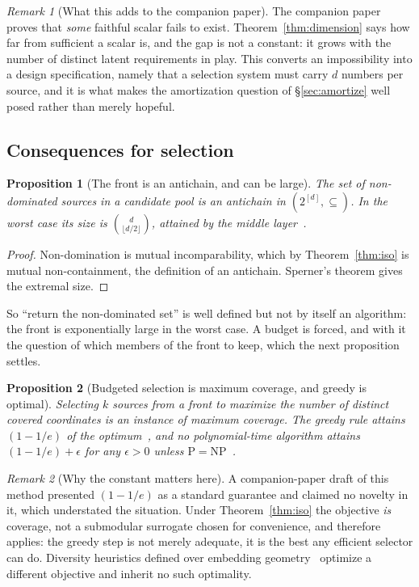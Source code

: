 \documentclass[11pt]{article}
\theoremstyle{plain}
\newtheorem{proposition}{Proposition}
\theoremstyle{definition}
\theoremstyle{remark}
\newtheorem{remark}{Remark}
\begin{document}
\begin{remark}[What this adds to the companion paper]
The companion paper proves that \emph{some} faithful scalar fails to exist. Theorem~\ref{thm:dimension}
says how far from sufficient a scalar is, and the gap is not a constant: it grows with the number
of distinct latent requirements in play. This converts an impossibility into a design specification,
namely that a selection system must carry $d$ numbers per source, and it is what makes the
amortization question of \S\ref{sec:amortize} well posed rather than merely hopeful.
\end{remark}

\subsection{Consequences for selection}
\label{sec:structure}

\begin{proposition}[The front is an antichain, and can be large]\label{prop:antichain}
The set of non-dominated sources in a candidate pool is an antichain in $(2^{[d]},\subseteq)$. In
the worst case its size is $\binom{d}{\lfloor d/2 \rfloor}$, attained by the middle
layer~\citep{sperner1928}.
\end{proposition}

\begin{proof}
Non-domination is mutual incomparability, which by Theorem~\ref{thm:iso} is mutual non-containment,
the definition of an antichain. Sperner's theorem gives the extremal size.
\end{proof}

So ``return the non-dominated set'' is well defined but not by itself an algorithm: the front is
exponentially large in the worst case. A budget is forced, and with it the question of which
members of the front to keep, which the next proposition settles.

\begin{proposition}[Budgeted selection is maximum coverage, and greedy is optimal]\label{prop:maxcover}
Selecting $k$ sources from a front to maximize the number of distinct covered coordinates is an
instance of maximum coverage. The greedy rule attains $(1-1/e)$ of the
optimum~\citep{nemhauser1978}, and no polynomial-time algorithm attains $(1-1/e)+\epsilon$ for any
$\epsilon>0$ unless $\mathrm{P} = \mathrm{NP}$~\citep{feige1998}.
\end{proposition}

\begin{remark}[Why the constant matters here]
A companion-paper draft of this method presented $(1-1/e)$ as a standard guarantee and claimed no
novelty in it, which understated the situation. Under Theorem~\ref{thm:iso} the objective
\emph{is} coverage, not a submodular surrogate chosen for convenience, and therefore
\citet{feige1998} applies: the greedy step is not merely adequate, it is the best any efficient
selector can do. Diversity heuristics defined over embedding
geometry~\citep{carbonell1998,ye2023ceil} optimize a different objective and inherit no such
optimality.
\end{remark}
\end{document}
